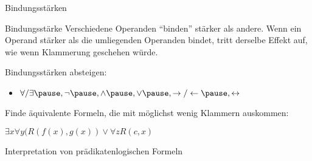 \begin{frame}{Bindungsstärken}
	\begin{block}{Bindungsstärke}
		Verschiedene Operanden ``binden'' stärker als andere. \ip Wenn ein Operand stärker als die umliegenden Operanden bindet, tritt derselbe Effekt auf, wie wenn Klammerung geschehen würde.
	\end{block}

	\bp
	
	Bindungsstärken absteigen:
	\begin{itemize}
		\ip \item $\forall / \exists\ip,\lnot\ip,\land\ip,\lor\ip,\rightarrow/\leftarrow\ip,\leftrightarrow$
	\end{itemize}

	\bp
	
	Finde äquivalente Formeln, die mit möglichst wenig Klammern auskommen:
	\begin{itemize}
		\pitem $\exists x \forall y (R(f(x), g(x)) \lor \forall z R(c, x)$ %
	\end{itemize}

\end{frame}

\begin{frame}{Interpretation von prädikatenlogischen Formeln}
	
\end{frame}

\begin{frame}

\end{frame}

